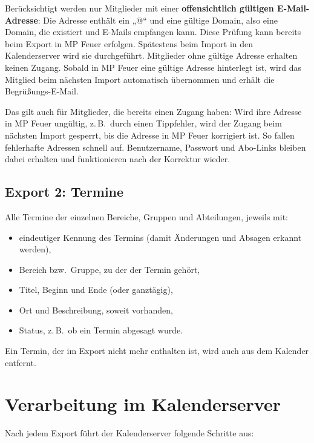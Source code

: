 \documentclass[a4paper,fontsize=10pt]{scrartcl}
\begin{document}
Berücksichtigt werden nur Mitglieder mit einer \textbf{offensichtlich gültigen
E-Mail-Adresse}: Die Adresse enthält ein „@“ und eine gültige Domain, also eine
Domain, die existiert und E-Mails empfangen kann. Diese Prüfung kann bereits
beim Export in MP Feuer erfolgen. Spätestens beim Import in den
Kalenderserver wird sie durchgeführt. Mitglieder ohne gültige Adresse erhalten
keinen Zugang. Sobald in MP Feuer eine gültige Adresse hinterlegt ist, wird
das Mitglied beim nächsten Import automatisch übernommen und erhält die
Begrüßungs-E-Mail.

Das gilt auch für Mitglieder, die bereits einen Zugang haben: Wird ihre Adresse
in MP Feuer ungültig, z.\,B.\ durch einen Tippfehler, wird der Zugang beim
nächsten Import gesperrt, bis die Adresse in MP Feuer korrigiert ist. So fallen
fehlerhafte Adressen schnell auf. Benutzername, Passwort und Abo-Links bleiben
dabei erhalten und funktionieren nach der Korrektur wieder.

\subsection*{Export 2: Termine}

Alle Termine der einzelnen Bereiche, Gruppen und Abteilungen, jeweils mit:
\begin{itemize}
  \item eindeutiger Kennung des Termins (damit Änderungen und Absagen
        erkannt werden),
  \item Bereich bzw.\ Gruppe, zu der der Termin gehört,
  \item Titel, Beginn und Ende (oder ganztägig),
  \item Ort und Beschreibung, soweit vorhanden,
  \item Status, z.\,B.\ ob ein Termin abgesagt wurde.
\end{itemize}

Ein Termin, der im Export nicht mehr enthalten ist, wird auch aus dem
Kalender entfernt.

\section{Verarbeitung im Kalenderserver}

Nach jedem Export führt der Kalenderserver folgende Schritte aus:
\end{document}
